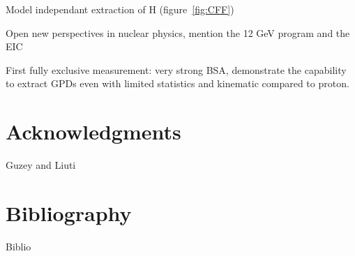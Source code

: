 \documentclass[%
 reprint,
 amsmath,amssymb,
 aps,
]{revtex4-1}
\begin{document}
Model independant extraction of H (figure~\ref{fig:CFF})



Open new perspectives in nuclear physics, mention the 12 GeV program and the EIC

First fully exclusive measurement: very strong BSA, demonstrate the capability to extract GPDs even with limited statistics and kinematic compared to proton.


\section*{Acknowledgments}
Guzey and Liuti

\section*{Bibliography}
Biblio
\end{document}
